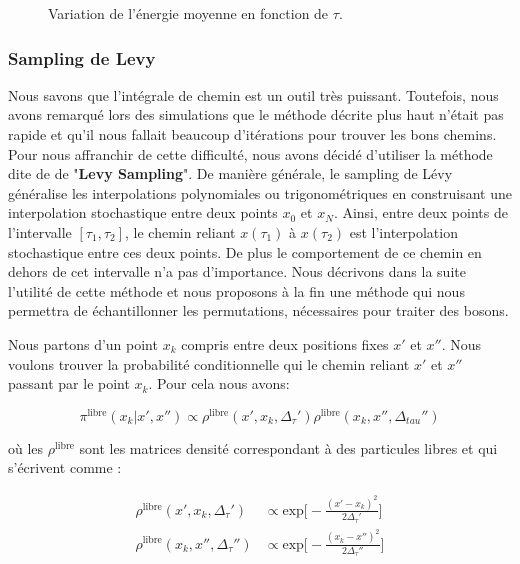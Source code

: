 \documentclass[11pt]{article}
\theoremstyle{definition}
\theoremstyle{remark}
\begin{document}
\begin{figure}[!h]
\centering

\caption{Variation de l'énergie moyenne en fonction de $\tau$.}
\end{figure}

\subsubsection{Sampling de Levy} 

Nous savons que l’intégrale de chemin est un outil très puissant. Toutefois, nous avons remarqué lors des simulations que le méthode décrite plus haut n'était pas rapide et qu'il nous fallait beaucoup d’itérations pour trouver les bons chemins. Pour nous affranchir de cette difficulté, nous avons décidé d'utiliser la méthode dite de de "\textbf{Levy Sampling}". De manière générale, le sampling de Lévy généralise les interpolations polynomiales ou trigonométriques en construisant une interpolation stochastique entre deux points $x_0$ et $x_N$. Ainsi, entre deux points de l'intervalle $[\tau_1, \tau_2]$, le chemin reliant $x(\tau_1)$ à $x(\tau_2)$ est l'interpolation stochastique entre ces deux points. De plus le comportement de ce chemin en dehors de cet intervalle n'a pas d'importance. Nous décrivons dans la suite l'utilité de cette méthode et nous proposons à la fin une méthode qui nous permettra de échantillonner les permutations, nécessaires pour traiter des bosons. 

Nous partons d'un point $x_k$ compris entre deux positions fixes $x'$ et $x''$. Nous voulons trouver la probabilité conditionnelle qui le chemin reliant $x'$ et $x''$ passant par le point $x_k$. Pour cela nous avons:

\begin{equation}
\label{proba_levy_1}
\pi^{\mathrm{libre}}(x_k|x',x'') \propto \rho^{\mathrm{libre}}(x', x_k, \Delta_{\tau}') \rho^{\mathrm{libre}}(x_k, x'', \Delta_{tau}'')
\end{equation} 

où les $\rho^{\mathrm{libre}}$ sont les matrices densité correspondant à des particules libres et qui s'écrivent comme : 

\begin{align}
\label{rho_free_levy}
\rho^{\mathrm{libre}}(x', x_k, \Delta_{\tau}') &\propto \mathrm{exp}\Big[ - \frac{(x'-x_k)^2}{2\Delta_{\tau}'} \Big] \\
\rho^{\mathrm{libre}}(x_k, x'', \Delta_{\tau}'') &\propto \mathrm{exp}\Big[ - \frac{(x_k-x'')^2}{2\Delta_{\tau}''} \Big]
\end{align}
\end{document}
